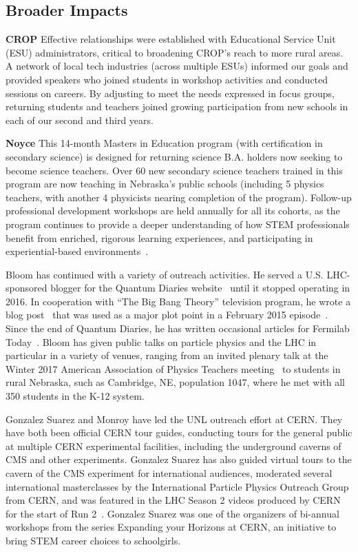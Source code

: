 \subsection{Broader Impacts}

{\bf CROP} %
Effective relationships were established with Educational Service Unit (ESU) administrators, critical to broadening CROP's reach to more rural areas. A network of local tech industries (across multiple ESUs) informed our goals and provided speakers who joined students in workshop activities and conducted sessions on careers. By adjusting to meet the needs expressed in focus groups, returning students and teachers joined growing participation from new schools in each of our second and third years.

{\bf Noyce}
This 14-month Masters in Education program (with certification in secondary science) is designed for returning science B.A. holders now seeking to become science teachers. Over 60 new secondary science teachers trained in this program are now teaching in Nebraska’s public schools (including 5 physics teachers, with another 4 physicists nearing completion of the program). Follow-up professional development workshops are held annually for all its cohorts, as the program continues to provide a deeper understanding of how STEM professionals benefit from enriched, rigorous learning experiences, and participating in experiential-based environments~\cite{bib:noyce}.

Bloom has continued with a variety of outreach activities.  He served a U.S. LHC-sponsored blogger for the Quantum Diaries website~\cite{bib:bloomblog} until it stopped operating in 2016.  In cooperation with ``The Big Bang Theory'' television program, he wrote a blog post~\cite{bib:TBBTQD} that was used as a major plot point in a February 2015 episode~\cite{bib:TBBTepisode}.  Since the end of Quantum Diaries, he has written occasional articles for Fermilab Today~\cite{bib:BloomFNALToday}.  Bloom has given public talks on particle physics and the LHC in particular in a variety of venues, ranging from an invited plenary talk at the Winter 2017 American Association of Physics Teachers meeting~\cite{bib:BloomAAPT} to students in rural Nebraska, such as Cambridge, NE, population 1047, where he met with all 350 students in the K-12 system.

Gonzalez Suarez and Monroy have led the UNL outreach effort at CERN. They have both been official CERN tour guides, conducting tours for the general public at multiple CERN experimental facilities, including the underground caverns of CMS and other experiments. Gonzalez Suarez has also guided virtual tours to the cavern of the CMS experiment for international audiences, moderated several international masterclasses by the International Particle Physics Outreach Group from CERN, and was featured in the LHC Season 2 videos produced by CERN for the start of Run 2~\cite{bib:LHCSeason2}. Gonzalez Suarez was one of the organizers of bi-annual workshops from the series Expanding your Horizons at CERN, an initiative to bring STEM career choices to schoolgirls. 

